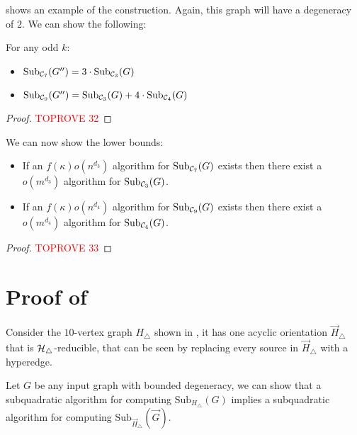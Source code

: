 \documentclass[a4paper,UKenglish,cleveref, autoref, numberwithinsect, thm-restate]{lipics-v2021}
\newcommand{\reducible}[1]{${#1}$-reducible}
\newcommand{\cycle}[1]{\cC_{#1}}
\newcommand{\hyperthree}{\cH_\triangle}
\newcommand{\expandGOdd}{G''}
\newcommand{\Sub}[2]{\mathrm{Sub}_{#2}(#1)}
\newcommand{\degen}{\kappa}
\newcommand{\cC}{{\cal C}}
\newcommand{\cH}{{\cal H}}
\begin{document}
		 shows an example of the construction. Again, this graph will have a degeneracy of $2$. We can show the following:
		
		\begin{lemma} \label{lem:equivalence2}
			For any odd $k$:
			\begin{itemize}
				\item $\Sub{\expandGOdd}{\cycle{7}} = 3 \cdot \Sub{G}{\cycle{3}}$
				\item $\Sub{\expandGOdd}{\cycle{9}} = \Sub{G}{\cycle{3}} + 4 \cdot \Sub{G}{\cycle{4}} $
			\end{itemize}
		\end{lemma}
		\begin{proof}\textcolor{red}{TOPROVE 32}\end{proof}
		
		We can now show the lower bounds:
		
		\begin{lemma}
			\begin{itemize}
			\item If an $f(\degen)o(n^{d_3})$ algorithm for $\Sub{G}{\cycle{7}}$ exists then there exist a $o(m^{d_3})$ algorithm for $\Sub{G}{\cycle{3}}$.
			\item If an $f(\degen)o(n^{d_4})$ algorithm for $\Sub{G}{\cycle{9}}$ exists then there exist a $o(m^{d_4})$ algorithm for $\Sub{G}{\cycle{4}}$.
		\end{itemize}
		\end{lemma}
		\begin{proof}\textcolor{red}{TOPROVE 33}\end{proof}
	
	
	
    \section{Proof of } \label{sec:hardness}

	Consider the $10$-vertex graph $H_\triangle$ shown in , it has one acyclic orientation $\vec{H}_\triangle$ that is \reducible{\hyperthree}, that can be seen by replacing every source in $\vec{H}_\triangle$  with a hyperedge.
	
	Let $G$ be any input graph with bounded degeneracy, we can show that a subquadratic algorithm for computing $\Sub{G}{H_\triangle}$ implies a subquadratic algorithm for computing $\Sub{\vec{G}}{\vec{H}_\triangle}$.
	
\end{document}
